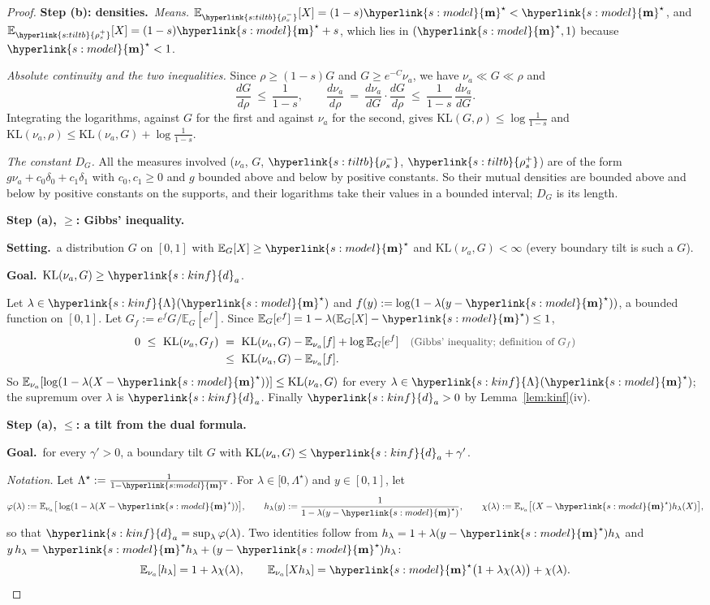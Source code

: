 \documentclass[10pt]{article}
\newcommand{\sy}[2]{{\hyperlink{#1}{#2}}}
\newcommand{\E}{\mathbb{E}}
\newcommand{\1}{\mathbf{1}}
\newcommand{\KL}{\mathrm{KL}}
\newcommand{\m}{\sy{s:model}{\mathbf{m}}}
\newcommand{\Lset}[1]{\sy{s:kinf}{\Lambda}(#1)}
\newcommand{\da}{\sy{s:kinf}{d}_a}
\newcommand{\rhom}{\sy{s:tiltb}{\rho^-_s}}
\newcommand{\rhop}{\sy{s:tiltb}{\rho^+_s}}
\newcommand{\Setting}{\noindent\textbf{Setting.}\ }
\newcommand{\Goal}{\par\smallskip\noindent\textbf{Goal.}\ }
\newcommand{\stp}[2]{\par\medskip\noindent\textbf{Step #1: #2.}\ }
\newcommand{\why}[1]{\text{\small\color{black!70}(#1)}}
\begin{document}
\begin{proof}
\stp{(b)}{densities}\emph{Means.} $\E_{\rhom}[X]=(1-s)\m^\star<\m^\star$, and $\E_{\rhop}[X]=(1-s)\m^\star+s$, which lies in $(\m^\star,1)$ because $\m^\star<1$.

\noindent\emph{Absolute continuity and the two inequalities.} Since $\rho\ge(1-s)G$ and $G\ge e^{-C}\nu_a$, we have $\nu_a\ll G\ll\rho$ and
\[
\frac{dG}{d\rho}\ \le\ \frac1{1-s},\qquad\frac{d\nu_a}{d\rho}\ =\ \frac{d\nu_a}{dG}\cdot\frac{dG}{d\rho}\ \le\ \frac1{1-s}\,\frac{d\nu_a}{dG}.
\]
Integrating the logarithms, against $G$ for the first and against $\nu_a$ for the second, gives $\KL(G,\rho)\le\log\frac1{1-s}$ and
$\KL(\nu_a,\rho)\le\KL(\nu_a,G)+\log\frac1{1-s}$.

\noindent\emph{The constant $D_G$.} All the measures involved ($\nu_a$, $G$, $\rhom$, $\rhop$) are of the form $g\nu_a+c_0\delta_0+c_1\delta_1$ with $c_0,c_1\ge0$ and $g$
bounded above and below by positive constants. So their mutual densities are bounded above and below by positive constants on the supports, and their logarithms take their
values in a bounded interval; $D_G$ is its length.

\stp{(a), $\ge$}{Gibbs' inequality}
\begin{setgoal}
\Setting a distribution $G$ on $[0,1]$ with $\E_G[X]\ge\m^\star$ and $\KL(\nu_a,G)<\infty$ (every boundary tilt is such a $G$).
\Goal $\KL(\nu_a,G)\ge\da$.
\end{setgoal}
Let $\lambda\in\Lset{\m^\star}$ and $f(y):=\log(1-\lambda(y-\m^\star))$, a bounded function on $[0,1]$. Let $G_f:=e^fG/\E_G[e^f]$. Since
$\E_G[e^f]=1-\lambda(\E_G[X]-\m^\star)\le1$,
\begin{align*}
0\ \le\ \KL(\nu_a,G_f)\ &=\ \KL(\nu_a,G)-\E_{\nu_a}[f]+\log\E_G[e^f]&&\why{Gibbs' inequality; definition of $G_f$}\\
&\le\ \KL(\nu_a,G)-\E_{\nu_a}[f].
\end{align*}
So $\E_{\nu_a}[\log(1-\lambda(X-\m^\star))]\le\KL(\nu_a,G)$ for every $\lambda\in\Lset{\m^\star}$; the supremum over $\lambda$ is $\da$. Finally $\da>0$ by
Lemma~\ref{lem:kinf}(iv).

\stp{(a), $\le$}{a tilt from the dual formula}
\begin{setgoal}
\Goal for every $\gamma'>0$, a boundary tilt $G$ with $\KL(\nu_a,G)\le\da+\gamma'$.
\end{setgoal}
\noindent\emph{Notation.} Let $\Lambda^\star:=\frac1{1-\m^\star}$. For $\lambda\in[0,\Lambda^\star)$ and $y\in[0,1]$, let
\[
\varphi(\lambda):=\E_{\nu_a}\big[\log(1-\lambda(X-\m^\star))\big],\qquad h_\lambda(y):=\frac1{1-\lambda(y-\m^\star)},\qquad\chi(\lambda):=\E_{\nu_a}\big[(X-\m^\star)h_\lambda(X)\big],
\]
so that $\da=\sup_\lambda\varphi(\lambda)$. Two identities follow from $h_\lambda=1+\lambda(y-\m^\star)h_\lambda$ and $y\,h_\lambda=\m^\star h_\lambda+(y-\m^\star)h_\lambda$:
\[
\E_{\nu_a}[h_\lambda]=1+\lambda\chi(\lambda),\qquad\E_{\nu_a}[Xh_\lambda]=\m^\star\big(1+\lambda\chi(\lambda)\big)+\chi(\lambda).
\]


\end{proof}
\end{document}
